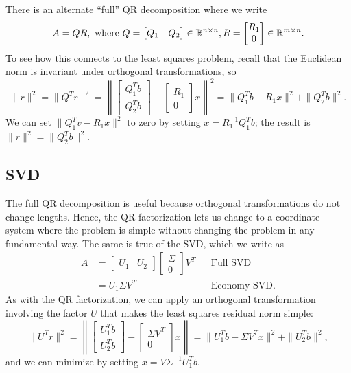 \documentclass[12pt, leqno]{article}
\begin{document}
There is an alternate ``full'' QR decomposition where we write
\[
A = QR, \mbox{ where }
Q = \begin{bmatrix} Q_1 & Q_2 \end{bmatrix} \in \mathbb{R}^{n \times n},
R = \begin{bmatrix} R_{1} \\ 0 \end{bmatrix} \in \mathbb{R}^{m \times n}.
\]
To see how this connects to the least squares problem, recall
that the Euclidean norm is invariant under orthogonal transformations,
so
\[
  \|r\|^2 = \|Q^T r\|^2 = \left\| \begin{bmatrix} Q_1^T b \\ Q_2^T
    b \end{bmatrix} - \begin{bmatrix} R_1 \\ 0 \end{bmatrix} x
  \right\|^2 = \|Q_1^T b-R_1x\|^2 + \|Q_2^T b\|^2.
\]
We can set $\|Q_1^T v-R_1 x\|^2$ to zero by
setting $x = R_1^{-1} Q_1^T b$; the result is
$\|r\|^2 = \|Q_2^T b\|^2$.

\subsection{SVD}

The full QR decomposition is useful because orthogonal transformations
do not change lengths.  Hence, the QR factorization lets us change
to a coordinate system where the problem is simple without changing
the problem in any fundamental way.  The same is true of the SVD,
which we write as
\begin{align*}
A &=
\begin{bmatrix} U_1 & U_2 \end{bmatrix}
\begin{bmatrix} \Sigma \\ 0 \end{bmatrix}
V^T & & \mbox{Full SVD} \\
&= U_1 \Sigma V^T & & \mbox{Economy SVD}.
\end{align*}
As with the QR factorization, we can apply an orthogonal
transformation involving the factor $U$ that makes the
least squares residual norm simple:
\[
\|U^T r\|^2 =
\left\| \begin{bmatrix} U_1^T b \\ U_2^T b \end{bmatrix} -
\begin{bmatrix} \Sigma V^T \\ 0 \end{bmatrix} x
\right\| =
\|U_1^T b - \Sigma V^T x\|^2 + \|U_2^T b\|^2,
\]
and we can minimize by setting $x = V \Sigma^{-1} U_1^T b$.
\end{document}
